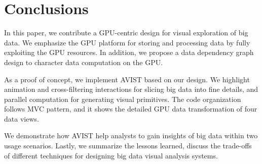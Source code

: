 

\section{Conclusions}

 In this paper, we contribute a GPU-centric design for visual exploration of big data. We emphasize the GPU platform for storing and processing data by fully exploiting the GPU resources. In addition, we propose a data dependency graph design to character data computation on the GPU. 
 
 As a proof of concept, we implement AVIST based on our design. We highlight animation and cross-filtering interactions for slicing big data into fine details, and parallel computation for generating visual primitives. The code organization follows MVC pattern, and it shows the detailed GPU data transformation of four data views. 
  
 We demonstrate how AVIST help analysts to gain insights of big data within two usage scenarios.  Lastly, we summarize the lessons learned, discuss the trade-offs of different techniques for designing big data visual analysis systems.  
  

